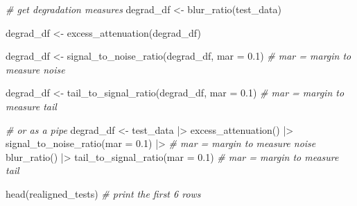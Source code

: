 \documentclass[
  letterpaper,
  DIV=11,
  numbers=noendperiod]{scrartcl}
\newenvironment{Shaded}{\begin{snugshade}}{\end{snugshade}}
\newcommand{\AttributeTok}[1]{\textcolor[rgb]{0.49,0.56,0.16}{#1}}
\newcommand{\CommentTok}[1]{\textcolor[rgb]{0.38,0.63,0.69}{\textit{#1}}}
\newcommand{\FloatTok}[1]{\textcolor[rgb]{0.25,0.63,0.44}{#1}}
\newcommand{\FunctionTok}[1]{\textcolor[rgb]{0.02,0.16,0.49}{#1}}
\newcommand{\NormalTok}[1]{\textcolor[rgb]{0.00,0.44,0.13}{#1}}
\newcommand{\OtherTok}[1]{\textcolor[rgb]{0.00,0.44,0.13}{#1}}
\newcommand{\SpecialCharTok}[1]{\textcolor[rgb]{0.25,0.44,0.63}{#1}}
\begin{document}
\begin{Shaded}
\begin{Highlighting}[numbers=left,,]
\CommentTok{\# get degradation measures}
\NormalTok{degrad\_df }\OtherTok{\textless{}{-}} \FunctionTok{blur\_ratio}\NormalTok{(test\_data)}

\NormalTok{degrad\_df }\OtherTok{\textless{}{-}} \FunctionTok{excess\_attenuation}\NormalTok{(degrad\_df)}

\NormalTok{degrad\_df }\OtherTok{\textless{}{-}} \FunctionTok{signal\_to\_noise\_ratio}\NormalTok{(degrad\_df, }
                                   \AttributeTok{mar =} \FloatTok{0.1}\NormalTok{) }\CommentTok{\# mar = margin to measure noise}

\NormalTok{degrad\_df }\OtherTok{\textless{}{-}} \FunctionTok{tail\_to\_signal\_ratio}\NormalTok{(degrad\_df, }\AttributeTok{mar =} \FloatTok{0.1}\NormalTok{) }\CommentTok{\# mar = margin to measure tail}

\CommentTok{\# or as a pipe}
\NormalTok{degrad\_df }\OtherTok{\textless{}{-}}\NormalTok{ test\_data }\SpecialCharTok{|\textgreater{}}
    \FunctionTok{excess\_attenuation}\NormalTok{() }\SpecialCharTok{|\textgreater{}}
    \FunctionTok{signal\_to\_noise\_ratio}\NormalTok{(}\AttributeTok{mar =} \FloatTok{0.1}\NormalTok{) }\SpecialCharTok{|\textgreater{}} \CommentTok{\# mar = margin to measure noise}
    \FunctionTok{blur\_ratio}\NormalTok{() }\SpecialCharTok{|\textgreater{}}
    \FunctionTok{tail\_to\_signal\_ratio}\NormalTok{(}\AttributeTok{mar =} \FloatTok{0.1}\NormalTok{) }\CommentTok{\# mar = margin to measure tail}

\FunctionTok{head}\NormalTok{(realigned\_tests) }\CommentTok{\# print the first 6 rows}
\end{Highlighting}
\end{Shaded}
\end{document}
